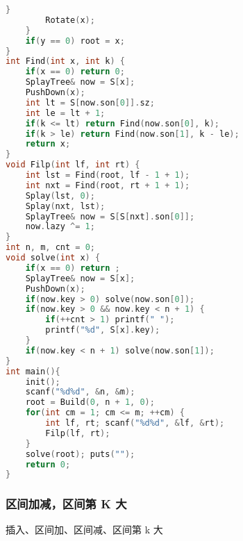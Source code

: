 \begin{lstlisting}[language=C++]
        }
        Rotate(x);
    }
    if(y == 0) root = x;
}
int Find(int x, int k) {
    if(x == 0) return 0;
    SplayTree& now = S[x];
    PushDown(x);
    int lt = S[now.son[0]].sz;
    int le = lt + 1;
    if(k <= lt) return Find(now.son[0], k);
    if(k > le) return Find(now.son[1], k - le);
    return x;
}
void Filp(int lf, int rt) {
    int lst = Find(root, lf - 1 + 1);
    int nxt = Find(root, rt + 1 + 1);
    Splay(lst, 0);
    Splay(nxt, lst);
    SplayTree& now = S[S[nxt].son[0]];
    now.lazy ^= 1;
}
int n, m, cnt = 0;
void solve(int x) {
    if(x == 0) return ;
    SplayTree& now = S[x];
    PushDown(x);
    if(now.key > 0) solve(now.son[0]);
    if(now.key > 0 && now.key < n + 1) {
        if(++cnt > 1) printf(" ");
        printf("%d", S[x].key);
    }
    if(now.key < n + 1) solve(now.son[1]);
}
int main(){
    init();
    scanf("%d%d", &n, &m);
    root = Build(0, n + 1, 0);
    for(int cm = 1; cm <= m; ++cm) {
        int lf, rt; scanf("%d%d", &lf, &rt);
        Filp(lf, rt);
    }
    solve(root); puts("");
    return 0;
}
\end{lstlisting}

\subsubsection{区间加减，区间第 K 大}

插入、区间加、区间减、区间第 k 大


